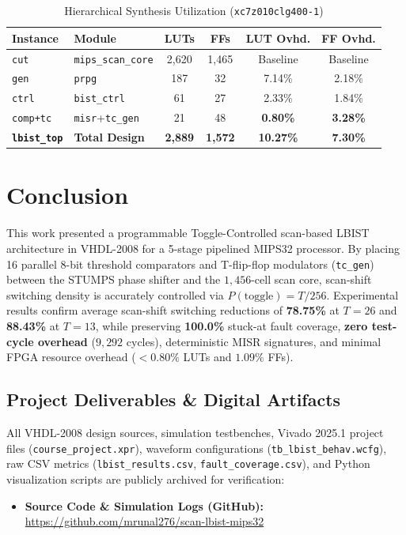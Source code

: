 \documentclass[conference]{IEEEtran}
\begin{document}
\begin{table}[H]
    \centering
    \caption{Hierarchical Synthesis Utilization (\texttt{xc7z010clg400-1})}
    \label{tab:util}
    \begin{tabular}{@{}llcccc@{}}
        \toprule
        \textbf{Instance} & \textbf{Module} & \textbf{LUTs} & \textbf{FFs} & \textbf{LUT Ovhd.} & \textbf{FF Ovhd.} \\
        \midrule
        \texttt{cut} & \texttt{mips\_scan\_core} & 2,620 & 1,465 & Baseline & Baseline \\
        \texttt{gen} & \texttt{prpg} & 187 & 32 & 7.14\% & 2.18\% \\
        \texttt{ctrl} & \texttt{bist\_ctrl} & 61 & 27 & 2.33\% & 1.84\% \\
        \texttt{comp+tc} & \texttt{misr}+\texttt{tc\_gen} & 21 & 48 & \textbf{0.80\%} & \textbf{3.28\%} \\
        \midrule
        \textbf{\texttt{lbist\_top}} & \textbf{Total Design} & \textbf{2,889} & \textbf{1,572} & \textbf{10.27\%} & \textbf{7.30\%} \\
        \bottomrule
    \end{tabular}
\end{table}



\section{Conclusion}
This work presented a programmable Toggle-Controlled scan-based LBIST architecture in VHDL-2008 for a 5-stage pipelined MIPS32 processor. By placing 16 parallel 8-bit threshold comparators and T-flip-flop modulators (\texttt{tc\_gen}) between the STUMPS phase shifter and the $1,456$-cell scan core, scan-shift switching density is accurately controlled via $P(\text{toggle}) = T/256$. Experimental results confirm average scan-shift switching reductions of \textbf{78.75\%} at $T=26$ and \textbf{88.43\%} at $T=13$, while preserving \textbf{100.0\%} stuck-at fault coverage, \textbf{zero test-cycle overhead} ($9,292$ cycles), deterministic MISR signatures, and minimal FPGA resource overhead ($<0.80\%$ LUTs and $1.09\%$ FFs).

\subsection*{Project Deliverables \& Digital Artifacts}
All VHDL-2008 design sources, simulation testbenches, Vivado 2025.1 project files (\texttt{course\_project.xpr}), waveform configurations (\texttt{tb\_lbist\_behav.wcfg}), raw CSV metrics (\texttt{lbist\_results.csv}, \texttt{fault\_coverage.csv}), and Python visualization scripts are publicly archived for verification:
\begin{itemize}
    \item \textbf{Source Code \& Simulation Logs (GitHub):}\\
    \url{https://github.com/mrunal276/scan-lbist-mips32}
\end{itemize}
\end{document}
